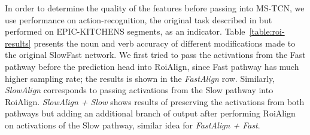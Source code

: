 In order to determine the quality of the features before passing into MS-TCN, we use performance on action-recognition, the original task described in \citet*{feichtenhofer2019slowfast} but performed on EPIC-KITCHENS segments, as an indicator. Table~\ref{table:roi-results} presents the noun and verb accuracy of different modifications made to the original SlowFast network. 
We first tried to pass the activations from the Fast pathway before the prediction head into RoiAlign, since Fast pathway has much higher sampling rate; the results is shown in the \textit{FastAlign} row. Similarly, \textit{SlowAlign} corresponds to passing activations from the Slow pathway into RoiAlign. \textit{SlowAlign + Slow} shows results of preserving the activations from both pathways but adding an additional branch of output after performing RoiAlign on activations of the Slow pathway, similar idea for \textit{FastAlign + Fast}. 


